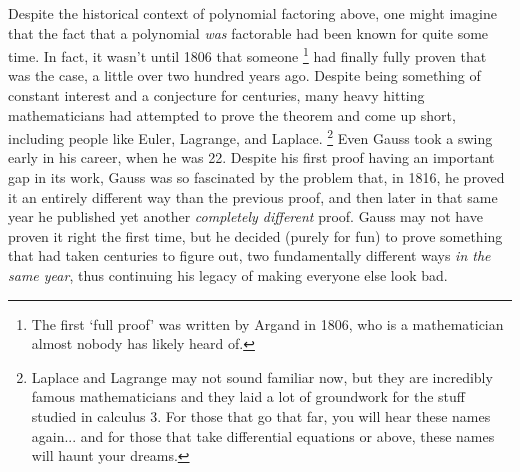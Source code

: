 \documentclass{ximeraXloud}
\begin{document}
Despite the historical context of polynomial factoring above, one might imagine that the fact that a polynomial \textit{was} factorable had been known for quite some time. In fact, it wasn't until 1806 that someone%
\footnote{The first `full proof' was written by Argand in 1806, who is a mathematician almost nobody has likely heard of.}
had finally fully proven that was the case, a little over two hundred years ago. Despite being something of constant interest and a conjecture for centuries, many heavy hitting mathematicians had attempted to prove the theorem and come up short, including people like Euler, Lagrange, and Laplace.%
\footnote{Laplace and Lagrange may not sound familiar now, but they are incredibly famous mathematicians and they laid a lot of groundwork for the stuff studied in calculus 3. For those that go that far, you will hear these names again... and for those that take differential equations or above, these names will haunt your dreams.}
Even Gauss took a swing early in his career, when he was 22. Despite his first proof having an important gap in its work, Gauss was so fascinated by the problem that, in 1816, he proved it an entirely different way than the previous proof, and then later in that same year he published yet another \textit{completely different} proof. Gauss may not have proven it right the first time, but he decided (purely for fun) to prove something that had taken centuries to figure out, two fundamentally different ways \textit{in the same year}, thus continuing his legacy of making everyone else look bad.

%
\end{document}
